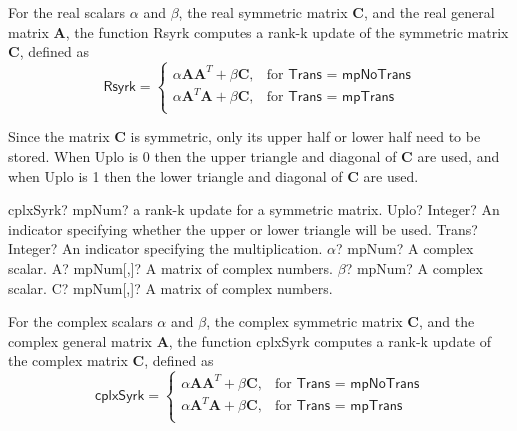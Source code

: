 \vspace{0.3cm}
For the real scalars $\alpha$ and $\beta$, the real symmetric matrix $\boldsymbol{C}$, and the real general matrix $\boldsymbol{A}$, the function \textsf{Rsyrk} computes a rank-k update of the symmetric matrix $\boldsymbol{C}$, defined as 
\begin{equation}
\textsf{Rsyrk}=\begin{cases}
\alpha \boldsymbol{A} \boldsymbol{A}^T + \beta \boldsymbol{C}, & \text{for } \textsf{Trans = mpNoTrans} \\
\alpha \boldsymbol{A}^T \boldsymbol{A} + \beta \boldsymbol{C}, & \text{for } \textsf{Trans = mpTrans} \\
\end{cases}
\end{equation}

Since the matrix $\boldsymbol{C}$ is symmetric, only its upper half or lower half need to be stored. When \textsf{Uplo} is 0 then the upper triangle and diagonal of $\boldsymbol{C}$ are used, and when \textsf{Uplo} is 1 then the lower triangle and diagonal of $\boldsymbol{C}$ are used. 


\vspace{0.6cm}
\begin{mpFunctionsExtract}
	\mpFunctionSix
	{cplxSyrk? mpNum? a rank-k update for a symmetric matrix.}
	{Uplo? Integer? An indicator specifying whether the upper or lower triangle will be used.}
	{Trans? Integer? An indicator specifying the multiplication.}
	{$\alpha$? mpNum? A complex scalar.}
	{A? mpNum[,]? A matrix of complex numbers.}
	{$\beta$? mpNum? A complex scalar.}
	{C? mpNum[,]? A matrix of complex numbers.}
\end{mpFunctionsExtract}

\vspace{0.3cm}
For the complex scalars $\alpha$ and $\beta$, the complex symmetric matrix $\boldsymbol{C}$, and the complex general matrix $\boldsymbol{A}$, the function \textsf{cplxSyrk} computes a rank-k update of the complex matrix $\boldsymbol{C}$, defined as 
\begin{equation}
\textsf{cplxSyrk}=\begin{cases}
\alpha \boldsymbol{A} \boldsymbol{A}^T + \beta \boldsymbol{C}, & \text{for } \textsf{Trans = mpNoTrans} \\
\alpha \boldsymbol{A}^T \boldsymbol{A} + \beta \boldsymbol{C}, & \text{for } \textsf{Trans = mpTrans} \\
\end{cases}
\end{equation}

